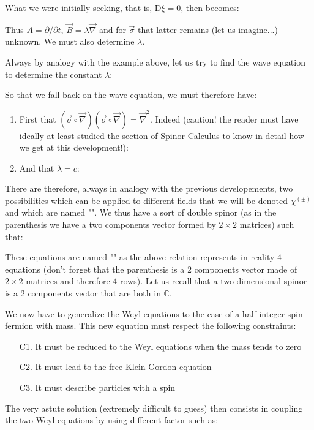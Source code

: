 	What we were initially seeking, that is, $\mathrm{D}\xi=0$, then becomes:
	
	Thus $A=\partial/\partial t$, $\vec{B}=\lambda\vec{\nabla}$ and for $\vec{\sigma}$ that latter remains (let us imagine...) unknown. We must also determine $\lambda$.
	
	Always by analogy with the example above, let us try to find the wave equation to determine the constant $\lambda$:
	
	So that we fall back on the wave equation, we must therefore have:
	\begin{enumerate}
		\item First that $\left(\vec{\sigma}\circ\vec{\nabla}\right)\left(\vec{\sigma}\circ\vec{\nabla}\right)=\vec{\nabla}^2$. Indeed (caution! the reader must have ideally at least studied the section of Spinor Calculus to know in detail how we get at this development!):
		
	
		\item And that $\lambda=c$:
		
	\end{enumerate}
	There are therefore, always in analogy with the previous developements, two possibilities which can be applied to different fields that we will be denoted $\chi^{(\pm)}$ and which are named "". We thus have a sort of double spinor (as in the parenthesis we have a two components vector formed by $2\times 2$ matrices) such that:
	
	These equations are named "" as the above relation represents in reality $4$ equations (don't forget that the parenthesis is a $2$ components vector made of $2\times 2$ matrices and therefore $4$ rows). Let us recall that a two dimensional spinor is a $2$ components vector that are both in $\mathbb{C}$.

	We now have to generalize the Weyl equations to the case of a half-integer spin fermion with mass. This new equation must respect the following constraints:
	\begin{enumerate}
		\item[C1.] It must be reduced to the Weyl equations when the mass tends to zero

		\item[C2.] It must lead to the free Klein-Gordon equation

		\item[C3.] It must describe particles with a spin
	\end{enumerate}
	The very astute solution (extremely difficult to guess) then consists in coupling the two Weyl equations by using different factor such as:
	
